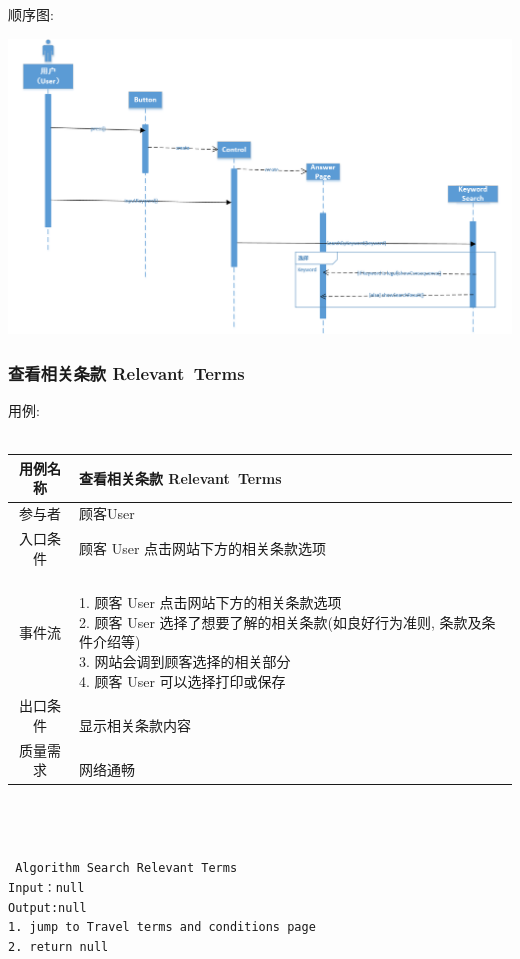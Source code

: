 \documentclass[11pt]{article}
\begin{document}
			顺序图: 
			\begin{center}
			\includegraphics[scale=0.42]{4.1顺序图.png}
			\end{center}

			


		\subsubsection{查看相关条款 Relevant\ Terms}
			用例: \\ \\
			\begin{tabular}{c|l}
			\hline
			用例名称 & 查看相关条款 Relevant\ Terms \\ \hline
			参与者 & 顾客User  \\ \hline
			入口条件 & 顾客 User  点击网站下方的相关条款选项 \\ \hline
			事件流 & 	\parbox{33em}{\ \\
						1. 顾客 User  点击网站下方的相关条款选项 \\
						2. 顾客 User 选择了想要了解的相关条款(如良好行为准则, 条款及条件介绍等) \\
						3. 网站会调到顾客选择的相关部分  \\
						4. 顾客 User 可以选择打印或保存 \\
						} \\ \hline
			出口条件 & \parbox{33em}{\ \\
						显示相关条款内容 \\
						} \\ \hline
			质量需求 & \parbox{33em}{\ \\
						网络通畅 \\
						} \\ \hline
			\end{tabular} \\ \\ \\
			\texttt{
			Algorithm Search Relevant Terms \\
			Input：null \\
			Output:null \\
			1.	jump to Travel terms and conditions page \\
			2.	return null \\
			} \\
\end{document}
